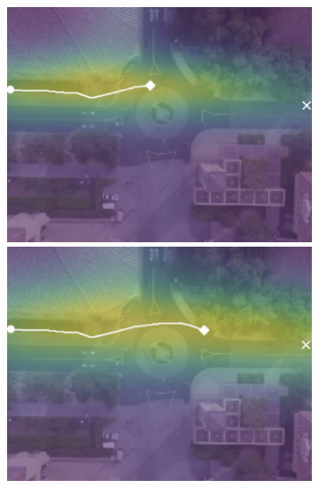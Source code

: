 \documentclass[letterpaper,10pt,conference]{ieeeconf}
\begin{document}
\begin{figure}[t!]
\begin{subfigure}[t]{0.48\textwidth}
\begin{minipage}[c]{0.3\linewidth}
	\end{minipage}
	\begin{minipage}[c]{0.3\linewidth}
		\includegraphics[width=\linewidth]{./figures/comparison/ours_death_1_2_t=250.jpg}
	\end{minipage}
	\begin{minipage}[c]{0.3\linewidth}
		\includegraphics[width=\linewidth]{./figures/comparison/ours_death_1_2_t=370.jpg}
	\end{minipage}
	

\end{subfigure}
\end{figure}
\end{document}
